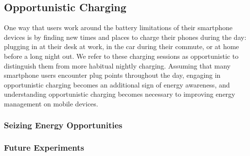 \subsection{Opportunistic Charging}
\label{subsec-opportunistic}

One way that users work around the battery limitations of their smartphone
devices is by finding new times and places to charge their phones during the
day: plugging in at their desk at work, in the car during their commute, or
at home before a long night out. We refer to these charging sessions as
opportunistic to distinguish them from more habitual nightly charging.
Assuming that many smartphone users encounter plug points throughout the day,
engaging in opportunistic charging becomes an additional sign of energy
awareness, and understanding opportunistic charging becomes necessary to
improving energy management on mobile devices.

\subsubsection{Seizing Energy Opportunities}

\subsubsection{Future Experiments}

